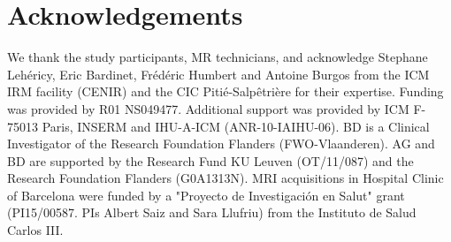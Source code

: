 \section{Acknowledgements}

We thank the study participants, MR technicians, and acknowledge Stephane Lehéricy, Eric Bardinet, Frédéric Humbert and
Antoine Burgos from the ICM IRM facility (CENIR) and the CIC
Pitié-Salpêtrière for their expertise. Funding was provided by R01 NS049477. Additional support was provided by ICM F-75013 Paris, INSERM and IHU-A-ICM
(ANR-10-IAIHU-06). BD is a Clinical Investigator of the Research Foundation Flanders (FWO-Vlaanderen). AG and BD are supported by the Research Fund KU Leuven (OT/11/087) and the Research Foundation Flanders (G0A1313N). MRI acquisitions in Hospital Clinic of Barcelona were funded by a "Proyecto de Investigación en Salut" grant (PI15/00587. PIs Albert Saiz and Sara Llufriu) from the Instituto de Salud Carlos III.